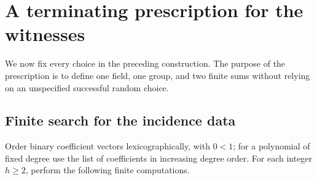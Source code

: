 \section{A terminating prescription for the witnesses}
\label{sec:prescription}

We now fix every choice in the preceding construction. The purpose of the prescription is to define one field, one group, and two finite sums without relying on an unspecified successful random choice.

\subsection{Finite search for the incidence data}

Order binary coefficient vectors lexicographically, with $0<1$; for a polynomial of fixed degree use the list of coefficients in increasing degree order. For each integer $h\ge2$, perform the following finite computations.
